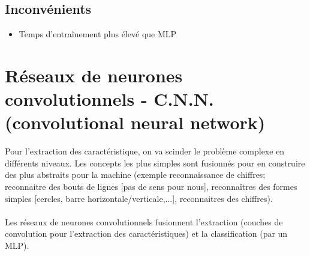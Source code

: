 \documentclass[a4paper,12pt,oneside]{report}	%
\begin{document}
        \subsection*{Inconvénients}
            \begin{itemize}
                \item Temps d'entraînement plus élevé que MLP
            \end{itemize}
    \section{Réseaux de neurones convolutionnels - C.N.N. (convolutional neural network)}
        Pour l'extraction des caractéristique, on va scinder le problème complexe en différents niveaux. Les concepts les plus simples sont fusionnés pour en construire des plus abstraits pour la machine (exemple reconnaissance de chiffres; reconnaitre des bouts de lignes [pas de sens pour nous], reconnaîtres des formes simples [cercles, barre horizontale/verticale,...], reconnaitres des chiffres).\\\\
        Les réseaux de neurones convolutionnels fusionnent l'extraction (couches de convolution pour l'extraction des caractéristiques) et la classification (par un MLP).
\end{document}
